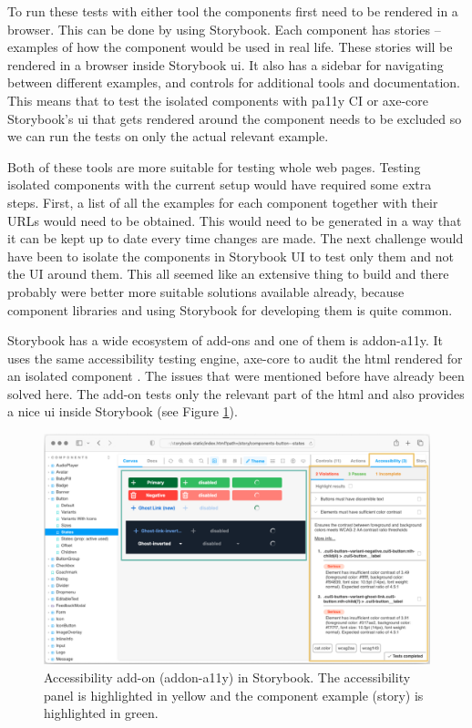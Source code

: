 \documentclass{master_thesis}
\begin{document}
To run these tests with either tool the components first need to be rendered in a browser. This can be done by using Storybook. Each component has stories – examples of how the component would be used in real life. These stories will be rendered in a browser inside Storybook \ac{ui}. It also has a sidebar for navigating between different examples, and controls for additional tools and documentation.
This means that to test the isolated components with pa11y CI or axe-core Storybook's \ac{ui} that gets rendered around the component needs to be excluded so we can run the tests on only the actual relevant example.

Both of these tools are more suitable for testing whole web pages. Testing isolated components with the current setup would have required some extra steps. First, a list of all the examples for each component together with their URLs would need to be obtained. This would need to be generated in a way that it can be kept up to date every time changes are made. The next challenge would have been to isolate the components in Storybook UI to test only them and not the UI around them. This all seemed like an extensive thing to build and there probably were better more suitable solutions available already, because component libraries and using Storybook for developing them is quite common.

Storybook has a wide ecosystem of add-ons and one of them is addon-a11y. It uses the same accessibility testing engine, axe-core to audit the \ac{html} rendered for an isolated component \citep{addon-a11y}. The issues that were mentioned before have already been solved here. The add-on tests only the relevant part of the \ac{html} and also provides a nice \ac{ui} inside Storybook (see Figure \ref{fig:addon-a11y}).

\begin{figure}[h]
	\includegraphics[width=\textwidth]{img/addon-a11y.png}
	\caption{Accessibility add-on (addon-a11y) in Storybook. The accessibility panel is highlighted in yellow and the component example (story) is highlighted in green.}
	\label{fig:addon-a11y}
\end{figure}
\end{document}
